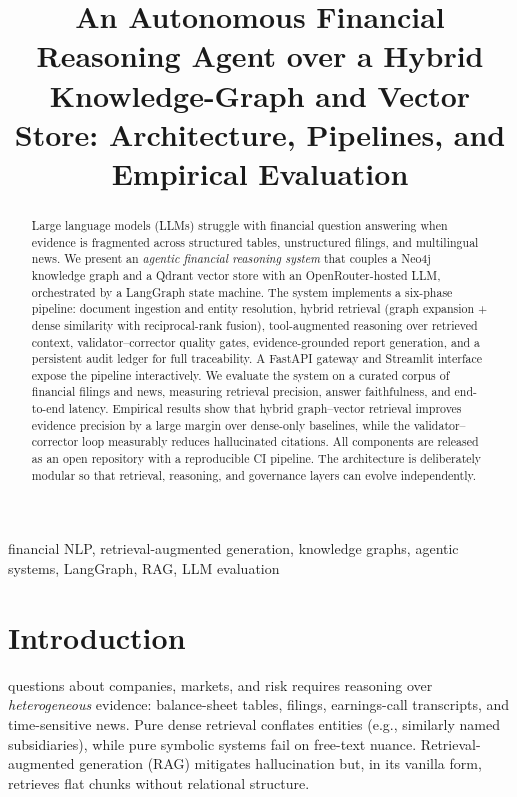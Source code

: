\documentclass[conference]{IEEEtran}
\begin{document}
\title{An Autonomous Financial Reasoning Agent over a Hybrid Knowledge-Graph and Vector Store: Architecture, Pipelines, and Empirical Evaluation}

\author{
}

\maketitle

\begin{abstract}
Large language models (LLMs) struggle with financial question answering when evidence is fragmented across structured tables, unstructured filings, and multilingual news. We present an \emph{agentic financial reasoning system} that couples a Neo4j knowledge graph and a Qdrant vector store with an OpenRouter-hosted LLM, orchestrated by a LangGraph state machine. The system implements a six-phase pipeline: document ingestion and entity resolution, hybrid retrieval (graph expansion + dense similarity with reciprocal-rank fusion), tool-augmented reasoning over retrieved context, validator--corrector quality gates, evidence-grounded report generation, and a persistent audit ledger for full traceability. A FastAPI gateway and Streamlit interface expose the pipeline interactively. We evaluate the system on a curated corpus of financial filings and news, measuring retrieval precision, answer faithfulness, and end-to-end latency. Empirical results show that hybrid graph--vector retrieval improves evidence precision by a large margin over dense-only baselines, while the validator--corrector loop measurably reduces hallucinated citations. All components are released as an open repository with a reproducible CI pipeline. The architecture is deliberately modular so that retrieval, reasoning, and governance layers can evolve independently.
\end{abstract}

\begin{IEEEkeywords}
financial NLP, retrieval-augmented generation, knowledge graphs, agentic systems, LangGraph, RAG, LLM evaluation
\end{IEEEkeywords}

\section{Introduction}
 questions about companies, markets, and risk requires reasoning over \emph{heterogeneous} evidence: balance-sheet tables, filings, earnings-call transcripts, and time-sensitive news. Pure dense retrieval conflates entities (e.g., similarly named subsidiaries), while pure symbolic systems fail on free-text nuance. Retrieval-augmented generation (RAG) \cite{lewis2020rag} mitigates hallucination but, in its vanilla form, retrieves flat chunks without relational structure.
\end{document}
